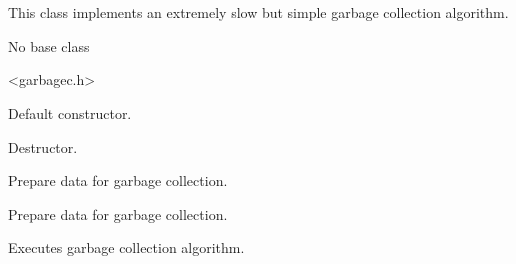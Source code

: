 %
%


\section{}\label{garbagecollector}


This class implements an extremely slow but simple garbage collection algorithm.


No base class


<garbagec.h>




\label{garbagecollectorgarbagecollector}


Default constructor.


\label{garbagecollectordtor}


Destructor.


\label{garbagecollectoradddependency}


Prepare data for garbage collection.


\label{garbagecollectoraddobject}


Prepare data for garbage collection.


\label{garbagecollectorarrangecollection}


Executes garbage collection algorithm.


\label{garbagecollectordestroyitemlist}


